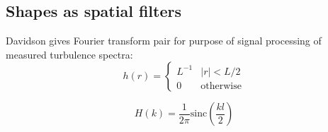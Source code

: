 \subsection{Shapes as spatial filters}

Davidson \cite{Davidson:2004} gives Fourier transform pair for purpose of signal processing of measured turbulence spectra:
\begin{equation}
h(r) = \left\{
\begin{array}{ll}
L^{-1} & |r|<L/2 \\
0 & \mbox{otherwise}
\end{array} \right.
\end{equation}


\begin{equation}
H(k) = \frac{1}{2\pi}\mbox{sinc}(\frac{kl}{2})
\end{equation}









%


